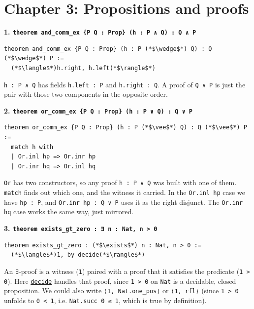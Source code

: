 \section{Chapter 3: Propositions and proofs}\label{sec:14-appendix-solutions:02-chapter-3:1}

\textbf{1. \texttt{theorem and\_\allowbreak{}comm\_\allowbreak{}ex \{P Q : Prop\} (h : P ∧ Q) : Q ∧ P}}

\begin{lstlisting}
theorem and_comm_ex {P Q : Prop} (h : P (*$\wedge$*) Q) : Q (*$\wedge$*) P :=
  (*$\langle$*)h.right, h.left(*$\rangle$*)
\end{lstlisting}

\texttt{h : P ∧ Q} has fields \texttt{h.left : P} and \texttt{h.right : Q}. A proof of \texttt{Q ∧ P} is just the pair with those two components in the opposite order.

\textbf{2. \texttt{theorem or\_\allowbreak{}comm\_\allowbreak{}ex \{P Q : Prop\} (h : P ∨ Q) : Q ∨ P}}

\begin{lstlisting}
theorem or_comm_ex {P Q : Prop} (h : P (*$\vee$*) Q) : Q (*$\vee$*) P :=
  match h with
  | Or.inl hp => Or.inr hp
  | Or.inr hq => Or.inl hq
\end{lstlisting}

\texttt{Or} has two constructors, so any proof \texttt{h : P ∨ Q} was built with one of them. \texttt{match} finds out which one, and the witness it carried. In the \texttt{Or.inl hp} case we have \texttt{hp : P}, and \texttt{Or.inr hp : Q ∨ P} uses it as the right disjunct. The \texttt{Or.inr hq} case works the same way, just mirrored.

\textbf{3. \texttt{theorem exists\_\allowbreak{}gt\_\allowbreak{}zero : ∃ n : Nat, n > 0}}

\begin{lstlisting}
theorem exists_gt_zero : (*$\exists$*) n : Nat, n > 0 :=
  (*$\langle$*)1, by decide(*$\rangle$*)
\end{lstlisting}

An \texttt{∃}-proof is a witness (\texttt{1}) paired with a proof that it satisfies the predicate (\texttt{1 > 0}). Here \href{https://lean-lang.org/doc/reference/latest/Tactic-Proofs/Tactic-Reference/}{\texttt{decide}} handles that proof, since \texttt{1 > 0} on \texttt{Nat} is a decidable, closed proposition. We could also write \texttt{⟨1, Nat.one\_\allowbreak{}pos⟩} or \texttt{⟨1, rfl⟩} (since \texttt{1 > 0} unfolds to \texttt{0 < 1}, i.e. \texttt{Nat.succ 0 ≤ 1}, which is true by definition).
